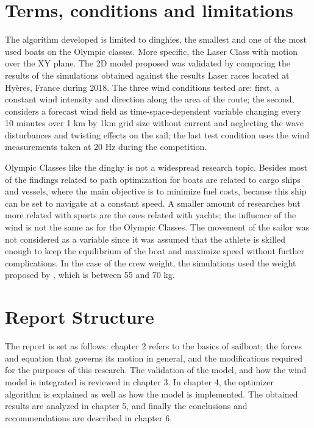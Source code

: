  \section{Terms, conditions and limitations}
The algorithm developed is limited to dinghies, the smallest and one of the most used boats on the Olympic classes. More specific, the Laser Class with motion over the XY plane.  The 2D model proposed was validated by comparing the results of the simulations obtained against the results Laser races located at Hyères, France during 2018. The three wind conditions tested are: first, a constant wind intensity and direction along the area of the route; the second, considers a forecast wind field as time-space-dependent variable changing every 10 minutes over 1 km by 1km grid size without current and neglecting the wave disturbances and twisting effects on the sail; the last test condition uses the wind measurements taken at 20 Hz during the competition. \par 

Olympic Classes like the dinghy is not a widespread research topic. Besides most of the findings related to path optimization for boats are related to cargo ships and vessels, where the main objective is to minimize fuel costs, because this ship can be set to navigate at a constant speed. A smaller amount of researches but more related with sports are the ones related with yachts; the influence of the wind is not the same as for the Olympic Classes. The movement of the sailor was not considered as a variable since it was assumed that the athlete is skilled enough to keep the equilibrium of the boat and  maximize speed without further complications. In the case of the crew weight, the simulations used the weight proposed by \cite{laser_opt}, which is between	55 and 70 kg.\par 

 
 \section{Report Structure}
The report is set as follows: chapter 2 refers to the basics of sailboat; the forces and equation that governs its motion in general, and the modifications required for the purposes of this research. The validation of the model, and how the wind model is integrated is reviewed in chapter 3. In chapter 4, the optimizer algorithm is explained as well as how the model is implemented.  The obtained results are analyzed in chapter 5, and finally the conclusions and recommendations are described in chapter 6.\par 

